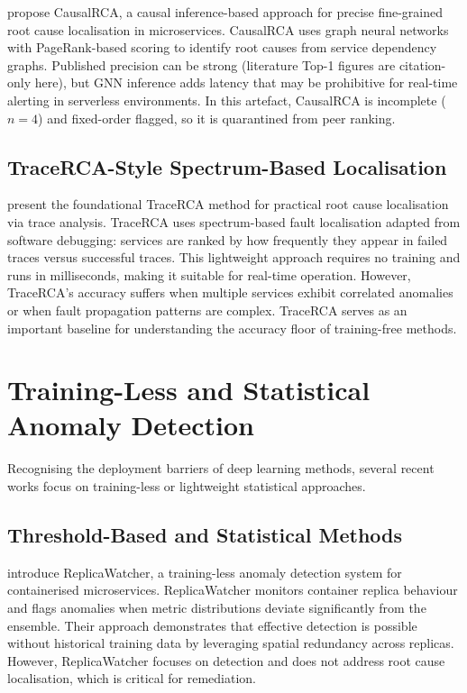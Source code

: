 \citet{xin2023causalrca} propose CausalRCA, a causal inference-based approach for precise fine-grained root cause localisation in microservices. CausalRCA uses graph neural networks with PageRank-based scoring to identify root causes from service dependency graphs. Published precision can be strong (literature Top-1 figures are citation-only here), but GNN inference adds latency that may be prohibitive for real-time alerting in serverless environments. In this artefact, CausalRCA is incomplete ($n{=}4$) and fixed-order flagged, so it is quarantined from peer ranking.

\subsection{TraceRCA-Style Spectrum-Based Localisation}

\citet{li2021tracerca} present the foundational TraceRCA method for practical root cause localisation via trace analysis. TraceRCA uses spectrum-based fault localisation adapted from software debugging: services are ranked by how frequently they appear in failed traces versus successful traces. This lightweight approach requires no training and runs in milliseconds, making it suitable for real-time operation. However, TraceRCA's accuracy suffers when multiple services exhibit correlated anomalies or when fault propagation patterns are complex. TraceRCA serves as an important baseline for understanding the accuracy floor of training-free methods.

\section{Training-Less and Statistical Anomaly Detection}

Recognising the deployment barriers of deep learning methods, several recent works focus on training-less or lightweight statistical approaches.

\subsection{Threshold-Based and Statistical Methods}

\citet{elkhairi2024replicawatcher} introduce ReplicaWatcher, a training-less anomaly detection system for containerised microservices. ReplicaWatcher monitors container replica behaviour and flags anomalies when metric distributions deviate significantly from the ensemble. Their approach demonstrates that effective detection is possible without historical training data by leveraging spatial redundancy across replicas. However, ReplicaWatcher focuses on detection and does not address root cause localisation, which is critical for remediation.

